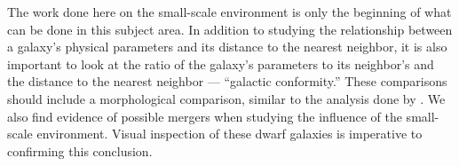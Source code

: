 The work done here on the small-scale environment is only the beginning of what 
can be done in this subject area.  In addition to studying the relationship 
between a galaxy's physical parameters and its distance to the nearest neighbor, 
it is also important to look at the ratio of the galaxy's parameters to its 
neighbor's and the distance to the nearest neighbor --- ``galactic 
conformity.''  These comparisons should include a morphological comparison, 
similar to the analysis done by \cite{Park09}.  We also find evidence of 
possible mergers when studying the influence of the small-scale environment.  
Visual inspection of these dwarf galaxies is imperative to confirming this 
conclusion.